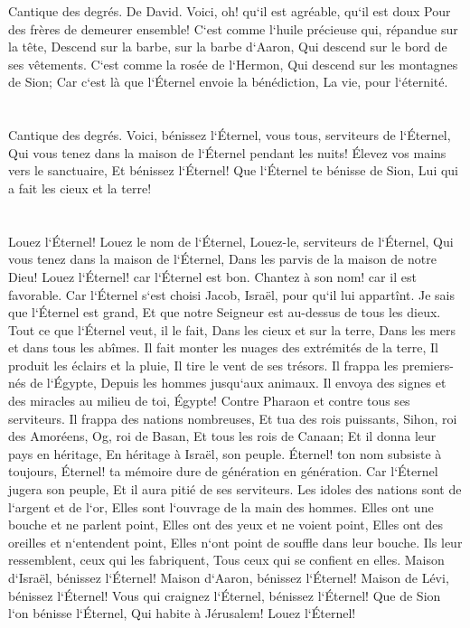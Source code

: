 \verse Cantique des degrés. De David. Voici, oh! qu`il est agréable, qu`il est doux Pour des frères de demeurer ensemble! 
\verse C`est comme l`huile précieuse qui, répandue sur la tête, Descend sur la barbe, sur la barbe d`Aaron, Qui descend sur le bord de ses vêtements. 
\verse C`est comme la rosée de l`Hermon, Qui descend sur les montagnes de Sion; Car c`est là que l`Éternel envoie la bénédiction, La vie, pour l`éternité. 

\chapter{}

\verse Cantique des degrés. Voici, bénissez l`Éternel, vous tous, serviteurs de l`Éternel, Qui vous tenez dans la maison de l`Éternel pendant les nuits! 
\verse Élevez vos mains vers le sanctuaire, Et bénissez l`Éternel! 
\verse Que l`Éternel te bénisse de Sion, Lui qui a fait les cieux et la terre! 

\chapter{}

\verse Louez l`Éternel! Louez le nom de l`Éternel, Louez-le, serviteurs de l`Éternel, 
\verse Qui vous tenez dans la maison de l`Éternel, Dans les parvis de la maison de notre Dieu! 
\verse Louez l`Éternel! car l`Éternel est bon. Chantez à son nom! car il est favorable. 
\verse Car l`Éternel s`est choisi Jacob, Israël, pour qu`il lui appartînt. 
\verse Je sais que l`Éternel est grand, Et que notre Seigneur est au-dessus de tous les dieux. 
\verse Tout ce que l`Éternel veut, il le fait, Dans les cieux et sur la terre, Dans les mers et dans tous les abîmes. 
\verse Il fait monter les nuages des extrémités de la terre, Il produit les éclairs et la pluie, Il tire le vent de ses trésors. 
\verse Il frappa les premiers-nés de l`Égypte, Depuis les hommes jusqu`aux animaux. 
\verse Il envoya des signes et des miracles au milieu de toi, Égypte! Contre Pharaon et contre tous ses serviteurs. 
\verse Il frappa des nations nombreuses, Et tua des rois puissants, 
\verse Sihon, roi des Amoréens, Og, roi de Basan, Et tous les rois de Canaan; 
\verse Et il donna leur pays en héritage, En héritage à Israël, son peuple. 
\verse Éternel! ton nom subsiste à toujours, Éternel! ta mémoire dure de génération en génération. 
\verse Car l`Éternel jugera son peuple, Et il aura pitié de ses serviteurs. 
\verse Les idoles des nations sont de l`argent et de l`or, Elles sont l`ouvrage de la main des hommes. 
\verse Elles ont une bouche et ne parlent point, Elles ont des yeux et ne voient point, 
\verse Elles ont des oreilles et n`entendent point, Elles n`ont point de souffle dans leur bouche. 
\verse Ils leur ressemblent, ceux qui les fabriquent, Tous ceux qui se confient en elles. 
\verse Maison d`Israël, bénissez l`Éternel! Maison d`Aaron, bénissez l`Éternel! 
\verse Maison de Lévi, bénissez l`Éternel! Vous qui craignez l`Éternel, bénissez l`Éternel! 
\verse Que de Sion l`on bénisse l`Éternel, Qui habite à Jérusalem! Louez l`Éternel! 

